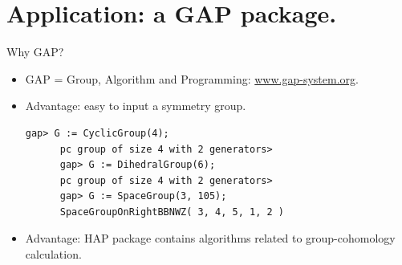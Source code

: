 \documentclass[xcolor=table, aspectratio=169]{beamer}
\newcommand{\uone}{\mathbb R/\mathbb Z}
\begin{document}
\section{Application: a GAP package.}

\begin{frame}[fragile]{Why GAP?}
  \begin{itemize}
  \item GAP = Group, Algorithm and Programming: \url{www.gap-system.org}.
  \item Advantage: easy to input a symmetry group.
    \begin{lstlisting}[basicstyle=\footnotesize]
      gap> G := CyclicGroup(4);
      pc group of size 4 with 2 generators>
      gap> G := DihedralGroup(6);
      pc group of size 4 with 2 generators>
      gap> G := SpaceGroup(3, 105);
      SpaceGroupOnRightBBNWZ( 3, 4, 5, 1, 2 )
    \end{lstlisting}
  \item Advantage: HAP package contains algorithms related to group-cohomology calculation.			
  \end{itemize}
\end{frame}

\end{document}
